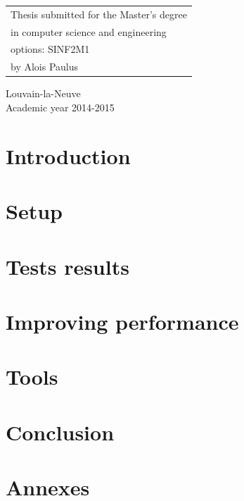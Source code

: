 \documentclass[a4paper, 12pt]{report}
\begin{document}
  \begin{minipage}{.5\textwidth}
  \begin{tabular}{l}
  Thesis submitted for the Master's degree
  \\ in computer science and engineering
  \\ options: SINF2M1
  \\ by Alois Paulus
  \end{tabular}
  \end{minipage}
  \vfill
  \begin{center}
  Louvain-la-Neuve
  \\ Academic year 2014-2015
  \end{center}

  \newpage

  \tableofcontents

  \newpage


 \chapter{Introduction}
 

 \chapter{Setup}
 

 \chapter{Tests results}
 

 \chapter{Improving performance}
 

 \chapter{Tools}
 

 \chapter{Conclusion}
 

 \printbibliography

 \appendix
  \chapter{Annexes}
  
\end{document}
